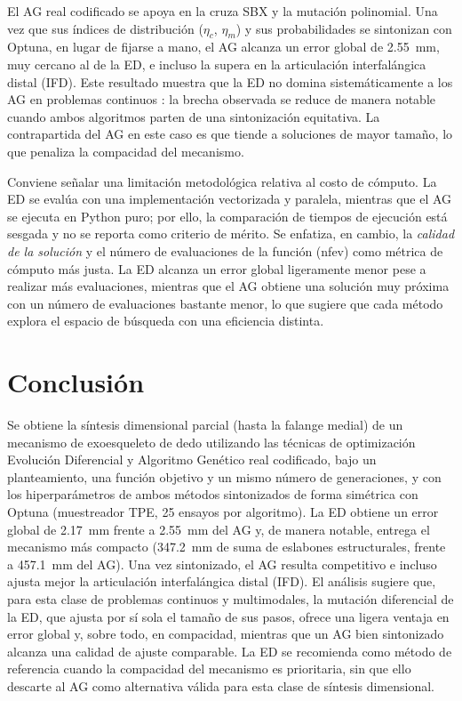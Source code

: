 \documentclass[conference]{IEEEtran}
\begin{document}
El AG real codificado se apoya en la cruza SBX y la mutación polinomial. Una vez
que sus índices de distribución ($\eta_c$, $\eta_m$) y sus probabilidades se
sintonizan con Optuna, en lugar de fijarse a mano, el AG alcanza un error global de 2.55~mm, muy cercano al de la ED, e incluso la supera
en la articulación interfalángica distal (IFD). Este resultado muestra que la ED no domina sistemáticamente a los AG en problemas
continuos \cite{ref_de_vs_ga,ref_ga_pso_de}: la brecha observada se reduce de
manera notable cuando ambos algoritmos parten de una sintonización equitativa.
La contrapartida del AG en este caso es que tiende a soluciones de mayor tamaño,
lo que penaliza la compacidad del mecanismo.

Conviene señalar una limitación metodológica relativa al costo de cómputo. La ED
se evalúa con una implementación vectorizada y paralela, mientras que el AG se
ejecuta en Python puro; por ello, la comparación de tiempos de ejecución está
sesgada y no se reporta como criterio de mérito. Se enfatiza, en cambio, la
\emph{calidad de la solución} y el número de evaluaciones de la función (nfev)
como métrica de cómputo más justa. La ED alcanza un error global ligeramente
menor pese a realizar más evaluaciones, mientras que el AG obtiene una solución
muy próxima con un número de evaluaciones bastante menor, lo que sugiere
que cada método explora el espacio de búsqueda con una eficiencia distinta.

\section{Conclusión}
Se obtiene la síntesis dimensional parcial (hasta la falange medial) de un
mecanismo de exoesqueleto de dedo utilizando las técnicas de optimización
Evolución Diferencial y Algoritmo Genético real codificado, bajo un planteamiento, una función objetivo y un mismo
número de generaciones, y con los hiperparámetros de ambos métodos sintonizados de
forma simétrica con Optuna (muestreador TPE, 25 ensayos por algoritmo). La ED
obtiene un error global de 2.17~mm frente a 2.55~mm del AG y, de manera notable,
entrega el mecanismo más compacto (347.2~mm de suma de eslabones estructurales,
frente a 457.1~mm del AG). Una vez sintonizado, el AG resulta competitivo e
incluso ajusta mejor la articulación interfalángica distal (IFD). El análisis
sugiere que, para esta clase de problemas continuos y multimodales, la mutación
diferencial de la ED, que ajusta por sí sola el tamaño de sus pasos, ofrece una
ligera ventaja en error global y, sobre todo, en compacidad, mientras que un AG
bien sintonizado alcanza una calidad de ajuste comparable. La ED se recomienda como método de referencia cuando la compacidad
del mecanismo es prioritaria, sin que ello descarte al AG como alternativa
válida para esta clase de síntesis dimensional.
\end{document}
